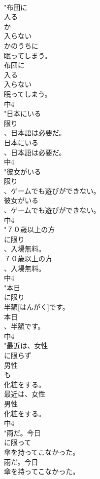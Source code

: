 \documentclass[8pt]{extreport}
\begin{document}
\begin{CJK}{UTF8}{min}
\\	"布団に
\\	入る
\\	か
\\	入らない
\\	かのうちに
\\	眠ってしまう。
\\	布団に
\\	入る
\\	入らない
\\	眠ってしまう。
\\	中4
\\	"日本にいる
\\	限り
\\	、日本語は必要だ。
\\	日本にいる
\\	、日本語は必要だ。
\\	中4
\\	"彼女がいる
\\	限り
\\	、ゲームでも遊びができない。
\\	彼女がいる
\\	、ゲームでも遊びができない。
\\	中4
\\	"７０歳以上の方
\\	に限り
\\	、入場無料。
\\	７０歳以上の方
\\	、入場無料。
\\	中4
\\	"本日
\\	に限り
\\	半額[はんがく]です。
\\	本日
\\	、半額です。
\\	中4
\\	"最近は、女性
\\	に限らず
\\	男性
\\	も
\\	化粧をする。
\\	最近は、女性
\\	男性
\\	化粧をする。
\\	中4
\\	"雨だ。今日
\\	に限って
\\	傘を持ってこなかった。
\\	雨だ。今日
\\	傘を持ってこなかった。

\end{CJK}
\end{document}

